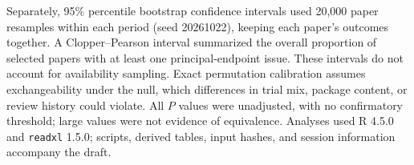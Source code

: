 Separately, 95\% percentile bootstrap confidence intervals used 20,000 paper resamples within each period (seed 20261022), keeping each paper's outcomes together. A Clopper--Pearson interval summarized the overall proportion of selected papers with at least one principal-endpoint issue. These intervals do not account for availability sampling. Exact permutation calibration assumes exchangeability under the null, which differences in trial mix, package content, or review history could violate. All \(P\) values were unadjusted, with no confirmatory threshold; large values were not evidence of equivalence. Analyses used R 4.5.0 and \texttt{readxl} 1.5.0; scripts, derived tables, input hashes, and session information accompany the draft.
